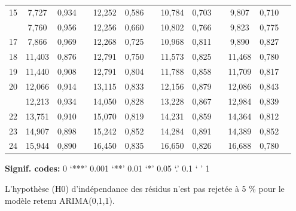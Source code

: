 \documentclass[french]{article}
\begin{document}
\begin{table}[!h]
{\begin{threeparttable}
\begin{tabular}[t]{ccccccccccccc}
15 & 7,727 & 0,934 &  & 12,252 & 0,586 &  & 10,784 & 0,703 &  & 9,807 & 0,710 & \\
\addlinespace
16 & 7,760 & 0,956 &  & 12,256 & 0,660 &  & 10,802 & 0,766 &  & 9,823 & 0,775 & \\
17 & 7,866 & 0,969 &  & 12,268 & 0,725 &  & 10,968 & 0,811 &  & 9,890 & 0,827 & \\
18 & 11,403 & 0,876 &  & 12,791 & 0,750 &  & 11,573 & 0,825 &  & 11,468 & 0,780 & \\
19 & 11,440 & 0,908 &  & 12,791 & 0,804 &  & 11,788 & 0,858 &  & 11,709 & 0,817 & \\
20 & 12,066 & 0,914 &  & 13,115 & 0,833 &  & 12,156 & 0,879 &  & 12,086 & 0,843 & \\
\addlinespace
21 & 12,213 & 0,934 &  & 14,050 & 0,828 &  & 13,228 & 0,867 &  & 12,984 & 0,839 & \\
22 & 13,751 & 0,910 &  & 15,070 & 0,819 &  & 14,231 & 0,859 &  & 14,364 & 0,812 & \\
23 & 14,907 & 0,898 &  & 15,242 & 0,852 &  & 14,284 & 0,891 &  & 14,389 & 0,852 & \\
24 & 15,944 & 0,890 &  & 16,450 & 0,835 &  & 16,650 & 0,826 &  & 16,688 & 0,780 & \\
\bottomrule
\end{tabular}
\begin{tablenotes}
\item \hspace{-0.4cm}\textbf{Signif. codes: }0 `***' 0.001 `**' 0.01 `*' 0.05 `.' 0.1 ` ' 1
\item L’hypothèse (H0) d'indépendance des résidus n’est pas rejetée à 5 \% pour le modèle retenu ARIMA(0,1,1).
\end{tablenotes}
\end{threeparttable}}
\end{table}
\end{document}
